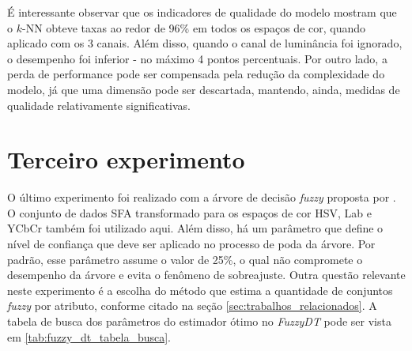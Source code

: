 É interessante observar que os indicadores de qualidade do modelo mostram que o $k$-NN obteve taxas ao redor de 96\% em todos os espaços de cor, quando aplicado com os 3 canais. Além disso, quando o canal de luminância foi ignorado, o desempenho foi inferior - no máximo 4 pontos percentuais. Por outro lado, a perda de performance pode ser compensada pela redução da complexidade do modelo, já que uma dimensão pode ser descartada, mantendo, ainda, medidas de qualidade relativamente significativas.

\section{Terceiro experimento}
\label{sec:experimento_tres}
O último experimento foi realizado com a árvore de decisão \emph{fuzzy} proposta por \citet{cintra:13}. O conjunto de dados SFA transformado para os espaços de cor HSV, Lab e YCbCr também foi utilizado aqui. Além disso, há um parâmetro que define o nível de confiança que deve ser aplicado no processo de poda da árvore. Por padrão, esse parâmetro assume o valor de 25\%, o qual não compromete o desempenho da árvore e evita o fenômeno de sobreajuste. Outra questão relevante neste experimento é a escolha do método que estima a quantidade de conjuntos \emph{fuzzy} por atributo, conforme citado na seção \ref{sec:trabalhos_relacionados}. A tabela de busca dos parâmetros do estimador ótimo no \emph{FuzzyDT} pode ser vista em \ref{tab:fuzzy_dt_tabela_busca}.

